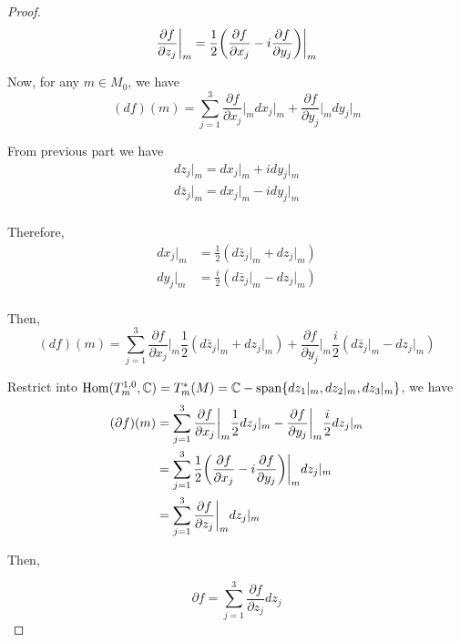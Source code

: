 \documentclass{article}
\begin{document}
\begin{proof}
$$
    \frac{\partial f}{\partial z_j}\bigg\vert_m = \frac{1}{2} \tuple*{\frac{\partial f}{\partial x_j}  - i\frac{\partial f}{\partial y_j} }\bigg\vert_m
$$

Now, for any $m \in M_0$, we have
$$
    (df)(m) = \sum_{j=1}^3 \frac{\partial f}{\partial x_j}\bigg\vert_m dx_j\vert_m + \frac{\partial f}{\partial y_j}\bigg\vert_m dy_j\vert_m
$$

From previous part we have
\begin{align*}
    dz_j\vert_m = dx_j\vert_m + i dy_j\vert_m \\
    d\bar{z}_j\vert_m = dx_j\vert_m - i dy_j\vert_m \\
\end{align*}

Therefore, 
\begin{align*}
    dx_j\vert_m &= \frac{1}{2} (d\bar{z}_j\vert_m + dz_j\vert_m) \\
    dy_j\vert_m &= \frac{i}{2} (d\bar{z}_j\vert_m - dz_j\vert_m) \\
\end{align*}

Then,
$$
    (df)(m) 
    = \sum_{j=1}^3 \frac{\partial f}{\partial x_j}\bigg\vert_m \frac{1}{2} (d\bar{z}_j\vert_m + dz_j\vert_m) + \frac{\partial f}{\partial y_j}\bigg\vert_m \frac{i}{2} (d\bar{z}_j\vert_m - dz_j\vert_m)
$$

Restrict into $\operatorname{Hom}(T^{1, 0}_m, \mathbb{C}) = T_m^*(M) = \mathbb{C}-\operatorname{span}\{dz_1\vert_m, dz_2\vert_m, dz_3\vert_m\}$, we have
\begin{align*}
    (\partial f)(m) 
    &= \sum_{j=1}^3 \frac{\partial f}{\partial x_j}\bigg\vert_m \frac{1}{2} dz_j\vert_m - \frac{\partial f}{\partial y_j}\bigg\vert_m \frac{i}{2} dz_j\vert_m \\
    &= \sum_{j=1}^3 \frac{1}{2} \tuple*{\frac{\partial f}{\partial x_j}  - i\frac{\partial f}{\partial y_j} }\bigg\vert_m dz_j\vert_m \\
    &= \sum_{j=1}^3 \frac{\partial f}{\partial z_j}\bigg\vert_m dz_j\vert_m
\end{align*}

Then,

$$
    \partial f = \sum_{j=1}^3 \frac{\partial f}{\partial z_j} dz_j
$$

\end{proof}
\end{document}
